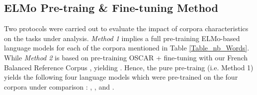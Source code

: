 \subsection{ELMo Pre-traing \& Fine-tuning Method}\label{MethodTRAIN}

Two protocols were carried out to evaluate the impact of corpora characteristics on the tasks under analysis. \textit{Method 1} implies a full pre-training ELMo-based language models for each of the corpora mentioned in Table \ref{Table_nb_Words}. While \textit{Method 2} is based on pre-training OSCAR + fine-tuning with our French Balanced Reference Corpus \Cabernet, yielding \ELMocoscar.
Hence, the pure pre-traing (i.e. Method 1) yields the following four language models which were pre-trained on the four corpora under comparison :  \ELMooscar, \ELMowiki, \ELMococa and \ELMocbt. %






